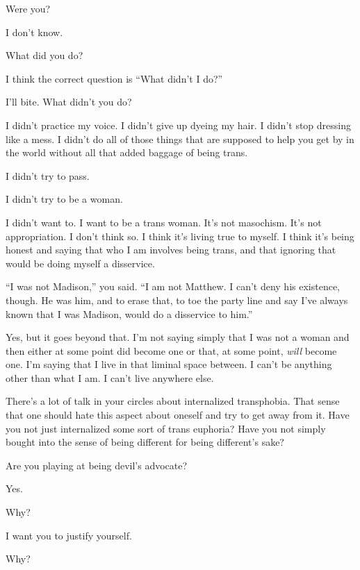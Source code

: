 \begin{ally}
Were you?
\end{ally}
I don't know.
\newpage

\begin{ally}
What did you do?
\end{ally}
I think the correct question is ``What didn't I do?''

\begin{ally}
I'll bite. What didn't you do?
\end{ally}
I didn't practice my voice. I didn't give up dyeing my hair. I didn't stop dressing like a mess. I didn't do all of those things that are supposed to help you get by in the world without all that added baggage of being trans.

I didn't try to pass.

I didn't try to be a woman.

I didn't want to. I want to be a trans woman. It's not masochism. It's not appropriation. I don't think so. I think it's living true to myself. I think it's being honest and saying that who I am involves being trans, and that ignoring that would be doing myself a disservice.

\begin{ally}
``I was not Madison,'' you said. ``I am not Matthew. I can't deny his existence, though. He was him, and to erase that, to toe the party line and say I've always known that I was Madison, would do a disservice to him.''
\end{ally}
Yes, but it goes beyond that. I'm not saying simply that I was not a woman and then either at some point did become one or that, at some point, \emph{will} become one. I'm saying that I live in that liminal space between. I can't be anything other than what I am. I can't live anywhere else.

\begin{ally}
There's a lot of talk in your circles about internalized transphobia. That sense that one should hate this aspect about oneself and try to get away from it. Have you not just internalized some sort of trans euphoria? Have you not simply bought into the sense of being different for being different's sake?
\end{ally}
Are you playing at being devil's advocate?

\begin{ally}
Yes.
\end{ally}
Why?

\begin{ally}
I want you to justify yourself.
\end{ally}
Why?

